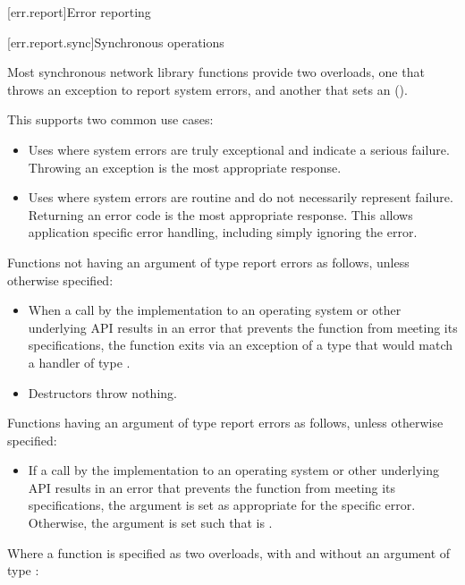 
[err.report]{Error reporting}


[err.report.sync]{Synchronous operations}

\pnum
Most synchronous network library functions provide two overloads, one that throws an exception to report system errors, and another that sets an  ().

\enternote This supports two common use cases:
\begin{itemize}
\item
 Uses where system errors are truly exceptional and indicate a serious failure. Throwing an exception is the most appropriate response.
\item
 Uses where system errors are routine and do not necessarily represent failure. Returning an error code is the most appropriate response. This allows application specific error handling, including simply ignoring the error.
\exitnote
\end{itemize}
\pnum
Functions not having an argument of type  report errors as follows, unless otherwise specified:

\begin{itemize}
\item
When a call by the implementation to an operating system or other underlying API results in an error that prevents the function from meeting its specifications, the function exits via an exception of a type that would match a handler of type .

\item
Destructors throw nothing.
\end{itemize}

\pnum
Functions having an argument of type  report errors as follows, unless otherwise specified:

\begin{itemize}
\item
If a call by the implementation to an operating system or other underlying API results in an error that prevents the function from meeting its specifications, the  argument  is set as appropriate for the specific error. Otherwise, the  argument is set such that  is .
\end{itemize}

\pnum
Where a function is specified as two overloads, with and without an argument of type :

